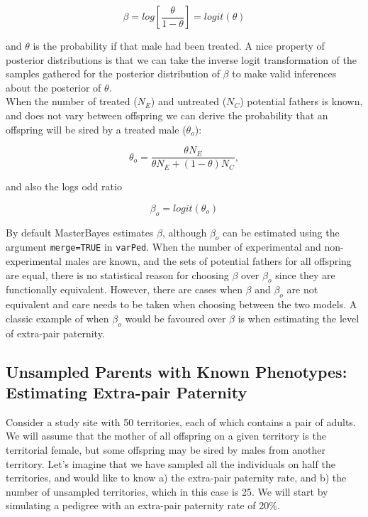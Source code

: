 \documentclass{article}
\begin{document}
\begin{equation}
\beta  = log\left[\frac{\theta}{1-\theta}\right] = logit(\theta)
\end{equation}

and $\theta$ is the probability if that male had been treated. A nice property of posterior distributions is that we can take the inverse logit transformation of the samples gathered for the posterior distribution of $\beta$ to make valid inferences about the posterior of $\theta$.\\

When the number of treated ($N_{E}$) and untreated ($N_{C}$) potential fathers is known, and does not vary between offspring we can derive the probability that an offspring will be sired by a treated male ($\theta_{o}$):

\begin{equation}
\theta_{o}  = \frac{\theta N_{E}}{\theta N_{E} + (1-\theta)N_{C}},  
\label{eq_thetao}
\end{equation}

and also the logs odd ratio

\begin{equation}
\beta_{o}  = logit(\theta_{o})
\end{equation}

By default MasterBayes estimates $\beta$, although $\beta_{o}$ can be estimated using the argument \texttt{merge=TRUE} in \texttt{varPed}.  When the number of experimental and non-experimental males are known, and the sets of potential fathers for all offspring are equal, there is no statistical reason for choosing $\beta$ over $\beta_{o}$ since they are functionally equivalent.  However, there are cases when $\beta$ and $\beta_{o}$ are not equivalent and care needs to be taken when choosing between the two models.  A classic example of when  $\beta_{o}$ would be favoured over $\beta$ is when estimating the level of extra-pair paternity.
 


\subsection{Unsampled Parents with Known Phenotypes: Estimating Extra-pair Paternity}
\label{EPP-sec}

Consider a study site with 50 territories, each of which contains a pair of adults.  We will assume that the mother of all offspring on a given territory is the territorial female, but some offspring may be sired by males from another territory.  Let's imagine that we have sampled all the individuals on half the territories, and would like to know a) the extra-pair paternity rate, and b) the number of unsampled territories, which in this case is 25. We will start by simulating a pedigree with an extra-pair paternity rate of 20\%.
\end{document}
